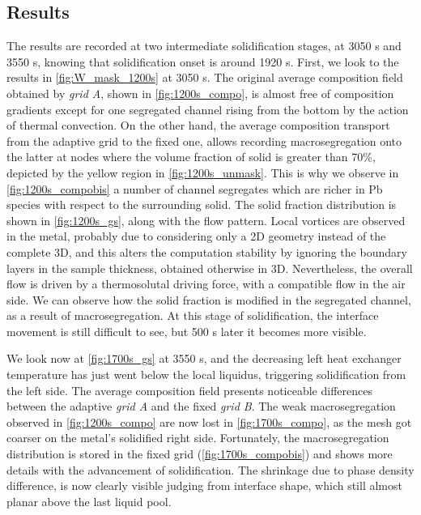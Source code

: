 \subsection{Results}

The results are recorded at two intermediate solidification stages, at 3050 s and 3550 s, knowing that solidification onset is around 1920 s.
First, we look to the results in \cref{fig:W_mask_1200s} at 3050 s. The original average composition field obtained by \emph{grid A}, shown in \cref{fig:1200s_compo},
is almost free of composition gradients except for one segregated channel rising from the bottom by the action of thermal convection.
On the other hand, the average composition transport from the adaptive grid to the fixed one, allows recording macrosegregation onto the latter
at nodes where the volume fraction of solid is greater than 70\%, depicted by the yellow region in \cref{fig:1200s_unmask}. 
This is why we observe in \cref{fig:1200s_compobis} a number of channel segregates
which are richer in Pb species with respect to the surrounding solid.
The solid fraction distribution is shown in \cref{fig:1200s_gs}, along with the flow pattern. Local vortices are observed in the metal, probably due 
to considering only a 2D geometry instead of the complete 3D, and this alters the computation stability by ignoring the boundary layers in the sample 
thickness, obtained otherwise in 3D. Nevertheless, the overall 
flow is driven by a thermosolutal driving force, with a compatible flow in the air side. 
We can observe how the solid fraction is modified in the segregated channel, as a result of macrosegregation.
At this stage of solidification, the interface movement is still difficult to see, but 500 s later it becomes more visible.


We look now at \cref{fig:1700s_gs} at 3550 s, and the decreasing left heat exchanger temperature has just went below the local liquidus, 
triggering solidification from the left side.
The average composition field presents noticeable differences between the adaptive \emph{grid A} and the fixed \emph{grid B}.
The weak macrosegregation observed in \cref{fig:1200s_compo} are now lost in \cref{fig:1700s_compo}, as the mesh got coarser on the metal's solidified right
side. Fortunately, the macrosegregation distribution is stored in the fixed grid (\cref{fig:1700s_compobis}) and shows more details with the advancement of solidification. 
The shrinkage due to phase density difference, is now clearly visible judging from interface shape, which still almost planar above the last liquid pool. 

